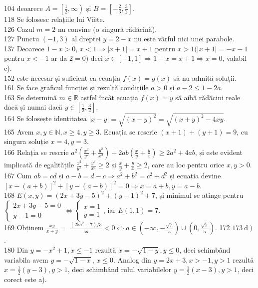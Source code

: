 \documentclass[11pt]{article}
\begin{document}
104 deoarece $A=\left[\frac{1}{2}, \infty\right)$ și $B=\left[-\frac{2}{3}, \frac{3}{2}\right]$.\\
118 Se folosesc relațiile lui Viète.\\
126 Cazul $m=2$ nu convine (o singură rădăcină).\\
127 Punctu $(-1,3)$ al dreptei $y=2-x$ nu este vârful nici unei parabole.\\
137 Deoarece $1-x>0$, $x<1 \Rightarrow|x+1|=x+1$ pentru $x>1(|x+1|=-x-1$ pentru $x<-1$ ar da $2=0$) deci $x \in[-1,1] \Rightarrow 1-x=x+1 \Rightarrow x=0$, valabil c).\\
152 este necesar și suficient ca ecuația $f(x)=g(x)$ să nu admită soluții.\\
161 Se face graficul funcției și rezultă condițiile $a>0$ și $a-2 \leq 1-2 a$.\\
163 Se determină $m \in \mathbb{R}$ astfel încât ecuația $f(x)=y$ să aibă rădăcini reale dacă și numai dacă $y \in\left[\frac{1}{2}, \frac{3}{2}\right]$.\\
164 Se folosește identitatea $|x-y|=\sqrt{(x-y)^{2}}=\sqrt{(x+y)^{2}-4 x y}$.\\ 
165 Avem $x, y \in \mathbb{N}, x \geq 4, y \geq 3$. Ecuația se rescrie $(x+1)+(y+1)=9$, cu singura soluție $x=4, y=3$.\\
166 Relația se rescrie $a^{2}\left(\frac{x^{2}}{y^{2}}+\frac{y^{2}}{x^{2}}\right)+2 a b\left(\frac{x}{y}+\frac{y}{x}\right) \geq 2 a^{2}+4 a b$, și este evident implicată de egalitățile $\frac{x^{2}}{y^{2}}+\frac{y^{2}}{x^{2}} \geq 2$ și $\frac{x}{y}+\frac{y}{x} \geq 2$, care au loc pentru orice $x, y>0$.\\
167 Cum $a b=c d$ și $a-b=d-c \Rightarrow a^{2}+b^{2}=c^{2}+d^{2}$ și ecuația devine $[x-(a+b)]^{2}+[y-(a-b)]^{2}=0 \Rightarrow x=a+b, y=a-b$.\\
168 $E(x, y)=(2 x+3 y-5)^{2}+(y-1)^{2}+7$, și minimul se atinge pentru $\left\{\begin{array}{l}2 x+3 y-5=0 \\ y-1=0\end{array} \Leftrightarrow\left\{\begin{array}{l}x=1 \\ y=1\end{array}\right.\right.$, iar $E(1,1)=7$.\\
169 Obținem $\frac{x y}{x+y}=$ $\frac{\left(25 a^{2}-7\right) / 3}{5 a}<0 \Leftrightarrow a \in\left(-\infty,-\frac{\sqrt{7}}{5}\right) \cup\left(0, \frac{\sqrt{7}}{5}\right)$.
172 $\left.173 \mathrm{~d}\right)$.\\
180 Din $y=-x^{2}+1, x \leq-1$ rezultă $x=-\sqrt{1-y}, y \leq 0$, deci schimbând variabila avem $y=-\sqrt{1-x}$, $x \leq 0$. Analog din $y=2 x+3, x>-1, y>1$ rezultă $x=\frac{1}{2}(y-3), y>1$, deci schimbând rolul variabilelor $y=\frac{1}{2}(x-3), y>1$, deci corect este a).\\
\end{document}
